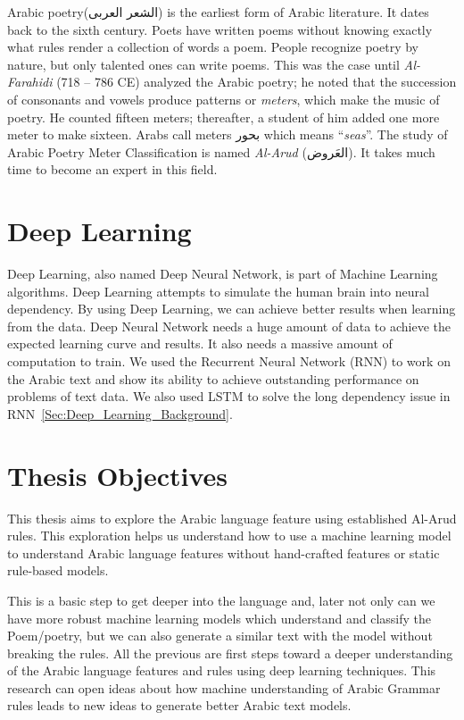 Arabic poetry(\textarabic{الشعر العربى}) is the earliest form of Arabic literature. It dates back to the sixth century. Poets have written poems without knowing exactly what rules render a collection of words a poem. People recognize poetry by nature, but only talented ones can write poems. This was the case until \textit{Al-Farahidi} (718 – 786 CE) analyzed the Arabic poetry; he noted that the succession of consonants and vowels produce patterns or \textit{meters}, which make the music of poetry. He counted fifteen meters; thereafter, a student of him added one more meter to make sixteen. Arabs call meters \textarabic{بحور} which means ``\textit{seas}''. The study of Arabic Poetry Meter Classification is named \textit{Al-Arud} (\textarabic{العَروض}). It takes much time to become an expert in this field. 
\section{Deep Learning}

Deep Learning, also named Deep Neural Network, is part of Machine Learning algorithms. Deep Learning attempts to simulate the human brain into neural dependency.  By using Deep Learning, we can achieve better results when learning from the data. Deep Neural Network needs a huge amount of data to achieve the expected learning curve and results. It also needs a massive amount of computation to train. We used the Recurrent Neural Network (RNN) to work on the Arabic text and show its ability to achieve outstanding performance on problems of text data. We also used LSTM to solve the long dependency issue in RNN~\ref{Sec:Deep_Learning_Background}.

\section{Thesis Objectives}
This thesis aims to explore the Arabic language feature using established Al-Arud rules. This exploration helps us understand how to use a machine learning model to understand Arabic language features without hand-crafted features or static rule-based models.

This is a basic step to get deeper into the language and, later not only can we have more robust machine learning models which understand and classify the Poem/poetry, but we can also generate a similar text with the model without breaking the rules. All the previous are first steps toward a deeper understanding of the Arabic language features and rules using deep learning techniques. This research can open ideas about how machine understanding of Arabic Grammar rules leads to new ideas to generate better Arabic text models.

